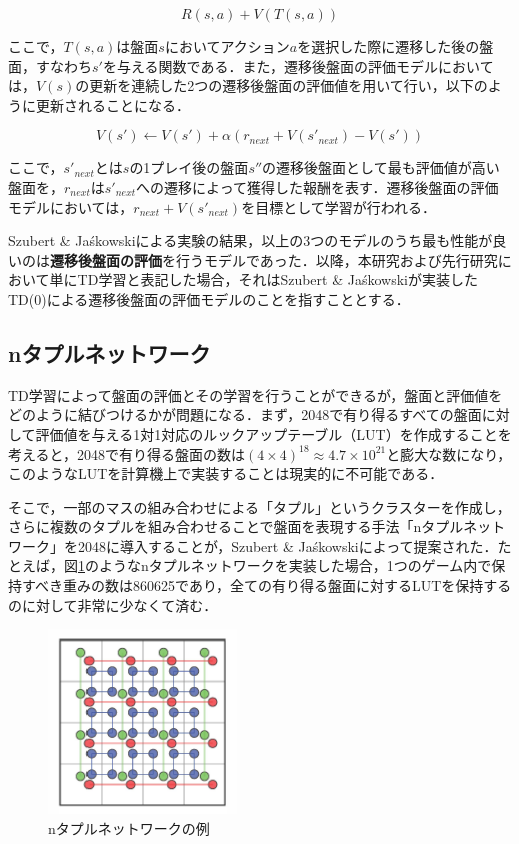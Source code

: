 \documentclass{suribt}
\begin{document}
\[
	R(s,a) + V(T(s,a))
\]

ここで，$T(s,a)$は盤面$s$においてアクション$a$を選択した際に遷移した後の盤面，すなわち$s'$を与える関数である．また，遷移後盤面の評価モデルにおいては，$V(s)$の更新を連続した2つの遷移後盤面の評価値を用いて行い，以下のように更新されることになる．

\[
	V(s') \leftarrow V(s') + \alpha (r_{next} + V(s'_{next}) - V(s') )
\]

ここで，$s'_{next}$とは$s$の1プレイ後の盤面$s''$の遷移後盤面として最も評価値が高い盤面を，$r_{next}$は$s'_{next}$への遷移によって獲得した報酬を表す．遷移後盤面の評価モデルにおいては，$r_{next}+V(s'_{next})$を目標として学習が行われる．

Szubert \& Ja\'{s}kowskiによる実験の結果，以上の3つのモデルのうち最も性能が良いのは\textbf{遷移後盤面の評価}を行うモデルであった．以降，本研究および先行研究において単にTD学習と表記した場合，それはSzubert \& Ja\'{s}kowskiが実装したTD(0)による遷移後盤面の評価モデルのことを指すこととする．

\subsection{nタプルネットワーク}
TD学習によって盤面の評価とその学習を行うことができるが，盤面と評価値をどのように結びつけるかが問題になる．まず，2048で有り得るすべての盤面に対して評価値を与える1対1対応のルックアップテーブル（LUT）を作成することを考えると，2048で有り得る盤面の数は$(4 \times 4)^{18} \approx 4.7 \times 10^{21}$と膨大な数になり，このようなLUTを計算機上で実装することは現実的に不可能である．

そこで，一部のマスの組み合わせによる「タプル」というクラスターを作成し，さらに複数のタプルを組み合わせることで盤面を表現する手法「nタプルネットワーク」を2048に導入することが，Szubert \& Ja\'{s}kowskiによって提案された．たとえば，図\ref{figure_001}のようなnタプルネットワークを実装した場合，1つのゲーム内で保持すべき重みの数は860625であり，全ての有り得る盤面に対するLUTを保持するのに対して非常に少なくて済む．

\begin{figure}[t]
	\begin{center}
	\includegraphics[width=5cm]{figure_001.png}
	\caption{nタプルネットワークの例}
	\label{figure_001}
	\end{center}
\end{figure}
\end{document}
